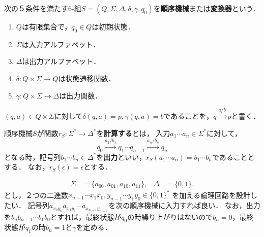 \documentclass[uplatex, dvipdfmx]{jsreport}
\begin{document}
\begin{definition}
    次の５条件を満たす6-組$S=(Q,\Sigma,\Delta,\delta,\gamma,q_0)$を\textbf{順序機械}または\textbf{変換器}という．
    \begin{enumerate}
        \item $Q$は有限集合で，$q_0\in Q$は初期状態．
        \item $\Sigma$は入力アルファベット．
        \item $\Delta$は出力アルファベット．
        \item $\delta:Q\times\Sigma\to Q$は状態遷移関数．
        \item $\gamma:Q\times\Sigma\to\Delta$は出力関数．
    \end{enumerate}
    $(q,a)\in Q\times\Sigma$に対して$\delta(q,a)=p,\gamma(q,a)=b$であることを，$q\xrightarrow{a/b}p$と書く．
\end{definition}

\begin{definition}[順序機械が計算する関数]
    順序機械$S$が関数$r_S:\Sigma^*\to\Delta^*$を\textbf{計算する}とは，
    入力$a_1\cdots a_n\in\Sigma^*$に対して，
    \[q_0\xrightarrow{a_1/b_1}q_1\cdots q_{n-1}\xrightarrow{a_n/b_n}q_n\]
    となる時，記号列$b_1\cdots b_n\in\Delta^*$を\textbf{出力}といい，$r_S(a_1\cdots a_n)=b_1\cdots b_n$であることとする．
    なお，$r_S(\epsilon)=\epsilon$とする．
\end{definition}

\begin{example}
    \begin{align*}
        \Sigma&=\{a_{00},a_{01},a_{10},a_{11}\},&\Delta&=\{0,1\}.
    \end{align*}
    とし，２つの二進数$x_{n-1}\cdots x_1x_0,y_{n-1}\cdots y_1y_0\in\{0,1\}^*$
    を加える論理回路を設計したい．
    記号列$a_{x_0y_0}a_{x_1y_1}\cdots a_{x_{n-1}y_{n-1}}$を次の順序機械に入力すれば良い．
    なお，出力を$b_nb_{n-1}\cdots b_1b_0$とすれば，最終状態が$q_0$の時繰り上がりはないので$b_n=0$，最終状態が$q_1$の時$b_n=1$と$\gamma$を定める．
    \begin{center}\end{center}
\end{example}
\end{document}
